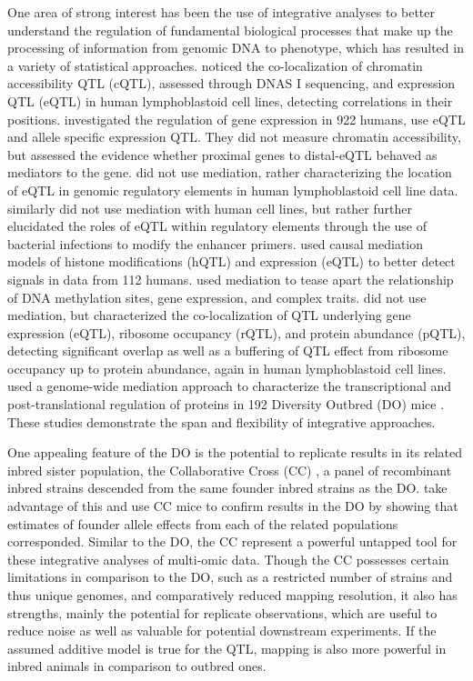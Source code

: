 One area of strong interest has been the use of integrative analyses to better understand the regulation of fundamental biological processes that make up the processing of information from genomic DNA to phenotype, which has resulted in a variety of statistical approaches. \cite{Degner2012} noticed the co-localization of chromatin accessibility QTL (cQTL), assessed through DNAS I sequencing, and expression QTL (eQTL) in human lymphoblastoid cell lines, detecting correlations in their positions. \cite{Battle2014} investigated the regulation of gene expression in 922 humans, use eQTL and allele specific expression QTL. They did not measure chromatin accessibility, but assessed the evidence whether proximal genes to distal-eQTL behaved as mediators to the gene. \cite{Pai2015} did not use mediation, rather characterizing the location of eQTL in genomic regulatory elements in human lymphoblastoid cell line data. \cite{Alasoo2017} similarly did not use mediation with human cell lines, but rather further elucidated the roles of eQTL within regulatory elements through the use of bacterial infections to modify the enhancer primers. \cite{Roytman2018} used causal mediation models of histone modifications (hQTL) and expression (eQTL) to better detect signals in data from 112 humans. \cite{Wu2018} used mediation to tease apart the relationship of DNA methylation sites, gene expression, and complex traits. \cite{Battle2015} did not use mediation, but characterized the co-localization of QTL underlying gene expression (eQTL), ribosome occupancy (rQTL), and protein abundance (pQTL), detecting significant overlap as well as a buffering of QTL effect from ribosome occupancy up to protein abundance, again in human lymphoblastoid cell lines. \cite{Chick2016} used a genome-wide mediation approach to characterize the transcriptional and post-translational regulation of proteins in 192 Diversity Outbred (DO) mice \citep{Churchill2012}. These studies demonstrate the span and flexibility of integrative approaches.

One appealing feature of the DO is the potential to replicate results in its related inbred sister population, the Collaborative Cross (CC) \citep{Churchill2004,Hall2012,Srivastava2017}, a panel of recombinant inbred strains descended from the same founder inbred strains as the DO. \cite{Chick2016} take advantage of this and use CC mice to confirm results in the DO by showing that estimates of founder allele effects from each of the related populations corresponded. Similar to the DO, the CC represent a powerful untapped tool for these integrative analyses of multi-omic data. Though the CC possesses certain limitations in comparison to the DO, such as a restricted number of strains and thus unique genomes, and comparatively reduced mapping resolution, it also has strengths, mainly the potential for replicate observations, which are useful to reduce noise as well as valuable for potential downstream experiments. If the assumed additive model is true for the QTL, mapping is also more powerful in inbred animals in comparison to outbred ones.

